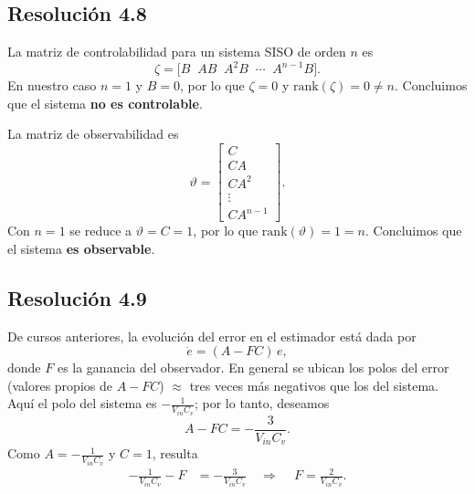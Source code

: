 \documentclass[
  11pt,
  letterpaper,
   addpoints,
  answers
  ]{exam}
\begin{document}
\begin{questions}
\begin{solution}
\subsection*{Resolución 4.8}

La matriz de controlabilidad para un sistema SISO de orden $n$ es
\begin{equation}
\zeta=\big[B\;\; AB\;\; A^{2}B\;\; \cdots\;\; A^{n-1}B\big].
\end{equation}
En nuestro caso $n=1$ y $B=0$, por lo que $\zeta=0$ y $\mathrm{rank}(\zeta)=0\neq n$. Concluimos que el sistema \textbf{no es controlable}.

La matriz de observabilidad es
\begin{equation}
\vartheta=
\begin{bmatrix}
C\\
CA\\
CA^{2}\\
\vdots\\
CA^{n-1}
\end{bmatrix}.
\end{equation}
Con $n=1$ se reduce a $\vartheta=C=1$, por lo que $\mathrm{rank}(\vartheta)=1=n$. Concluimos que el sistema \textbf{es observable}.

\subsection*{Resolución 4.9}

De cursos anteriores, la evolución del error en el estimador está dada por
\begin{equation}
\dot{e}=(A-FC)\,e,
\end{equation}
donde $F$ es la ganancia del observador. En general se ubican los polos del error (valores propios de $A-FC$) $\approx$ tres veces más negativos que los del sistema. Aquí el polo del sistema es $-\frac{1}{V_{in}C_v}$; por lo tanto, deseamos
\begin{equation}
A-FC=-\frac{3}{V_{in}C_v}.
\end{equation}
Como $A=-\frac{1}{V_{in}C_v}$ y $C=1$, resulta
\begin{align}
-\frac{1}{V_{in}C_v}-F
&=-\frac{3}{V_{in}C_v}
\quad\Rightarrow\quad
\boxed{\,F=\frac{2}{V_{in}C_v}.}
\end{align}

\end{solution}

\end{questions}
\end{document}
